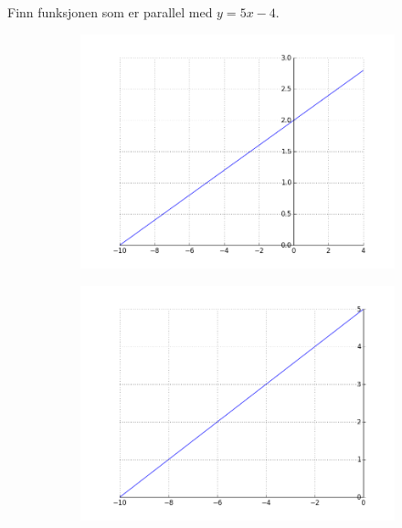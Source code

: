 \documentclass[12pt,twoside,onecolumn]{article}
\begin{document}
\begin{Exercise}
\label{ex:12}
Finn funksjonen som er parallel med $y = 5x - 4$.
\newline
\begin{figure}[h!]
    \centering
    \begin{subfigure}{.5\textwidth}
    \centering
    \includegraphics[scale = 0.4]{figures/xd5p2.png}
    \end{subfigure}%
    \begin{subfigure}{.5\textwidth}
    \centering
    \includegraphics[scale = 0.4]{figures/xd2p5.png}
    \end{subfigure}
    \begin{subfigure}{.5\textwidth}

\end{subfigure}
\end{figure}
\end{Exercise}
\end{document}
